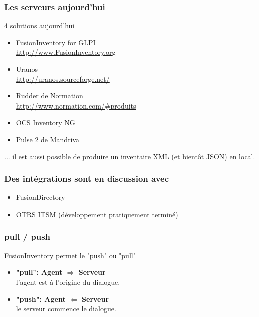 \documentclass{beamer}
\begin{document}
\begin{frame}
    \frametitle{Les serveurs aujourd'hui}

    \begin{block}{4 solutions aujourd'hui}
        \begin{itemize}
            \item FusionInventory for GLPI \\
            \url{http://www.FusionInventory.org}
            \item Uranos \\
            \url{http://uranos.sourceforge.net/}
            \item Rudder de Normation \\
            \url{http://www.normation.com/\#produits}
            \item OCS Inventory NG
            \item Pulse 2 de Mandriva

        \end{itemize}
        ... il est aussi possible de produire un inventaire XML (et bientôt JSON) en local.
    \end{block}

\end{frame}

\begin{frame}
    \frametitle{Des intégrations sont en discussion avec}

    \begin{itemize}
    \item FusionDirectory
    \item OTRS ITSM (développement pratiquement terminé)
    \end{itemize}
\end{frame}

\begin{frame}
    \frametitle{pull / push}

    \begin{block}{FusionInventory permet le "push" ou "pull"}
    \begin{itemize}
    \item \textbf{"pull": Agent $\Longrightarrow$ Serveur} \\
    l'agent est à l'origine du dialogue.
    \item \textbf{"push": Agent $\Longleftarrow$ Serveur} \\
    le serveur commence le dialogue.
    \end{itemize}
    \end{block}

\end{frame}
\end{document}

